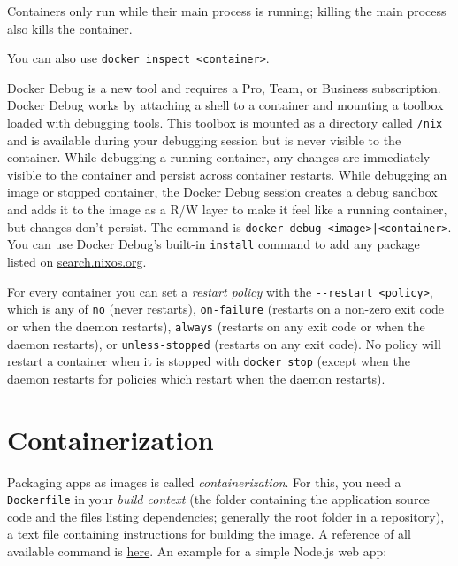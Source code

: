 \documentclass[8pt, table, xcdraw]{article}%
\begin{document}
Containers only run while their main process is running; killing the main process also kills the container.

You can also use \lstinline{docker inspect <container>}.

Docker Debug is a new tool and requires a Pro, Team, or Business subscription. Docker Debug works by attaching a shell to a container and mounting a toolbox loaded with debugging tools. This toolbox is mounted as a directory called \lstinline{/nix} and is available during your debugging session but is never visible to the container. While debugging a running container, any changes are immediately visible to the container and persist across container restarts. While debugging an image or stopped container, the Docker Debug session creates a debug sandbox and adds it to the image as a R/W layer to make it feel like a running container, but changes don't persist. The command is \lstinline{docker debug <image>|<container>}. You can use Docker Debug’s built-in \lstinline{install} command to add any package listed on \url{search.nixos.org}.

For every container you can set a \emph{restart policy} with the \lstinline{--restart <policy>}, which is any of \lstinline{no} (never restarts), \lstinline{on-failure} (restarts on a non-zero exit code or when the daemon restarts), \lstinline{always} (restarts on any exit code or when the daemon restarts), or \lstinline{unless-stopped} (restarts on any exit code). No policy will restart a container when it is stopped with \lstinline{docker stop} (except when the daemon restarts for policies which restart when the daemon restarts).

\section{Containerization}

Packaging apps as images is called \emph{containerization}. For this, you need a \lstinline{Dockerfile} in your \emph{build context} (the folder containing the application source code and the files listing dependencies; generally the root folder in a repository), a text file containing instructions for building the image. A reference of all available command is \href{https://docs.docker.com/reference/dockerfile/}{here}. An example for a simple Node.js web app:
\end{document}

